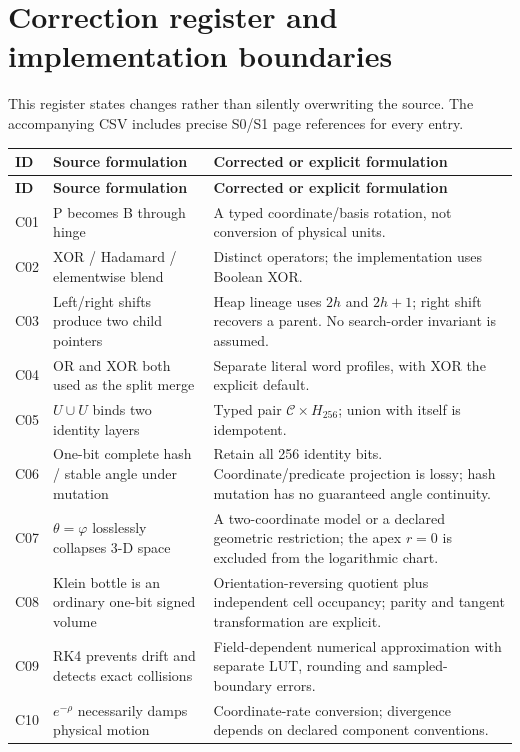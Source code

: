 \documentclass[11pt,a4paper]{article}
\newcommand{\ph}{\varphi}
\begin{document}
\section{Correction register and implementation boundaries}
This register states changes rather than silently overwriting the source. The accompanying CSV includes precise S0/S1 page references for every entry.

\small
\begin{longtable}{@{}P{13mm}P{52mm}P{96mm}@{}}
\toprule\textbf{ID} & \textbf{Source formulation} & \textbf{Corrected or explicit formulation}\\\midrule
\endfirsthead
\toprule\textbf{ID} & \textbf{Source formulation} & \textbf{Corrected or explicit formulation}\\\midrule\endhead
C01 & P becomes B through hinge & A typed coordinate/basis rotation, not conversion of physical units.\\
C02 & XOR / Hadamard / elementwise blend & Distinct operators; the implementation uses Boolean XOR.\\
C03 & Left/right shifts produce two child pointers & Heap lineage uses $2h$ and $2h+1$; right shift recovers a parent. No search-order invariant is assumed.\\
C04 & OR and XOR both used as the split merge & Separate literal word profiles, with XOR the explicit default.\\
C05 & $U\cup U$ binds two identity layers & Typed pair $\mathcal C\times H_{256}$; union with itself is idempotent.\\
C06 & One-bit complete hash / stable angle under mutation & Retain all 256 identity bits. Coordinate/predicate projection is lossy; hash mutation has no guaranteed angle continuity.\\
C07 & $\theta=\ph$ losslessly collapses 3-D space & A two-coordinate model or a declared geometric restriction; the apex $r=0$ is excluded from the logarithmic chart.\\
C08 & Klein bottle is an ordinary one-bit signed volume & Orientation-reversing quotient plus independent cell occupancy; parity and tangent transformation are explicit.\\
C09 & RK4 prevents drift and detects exact collisions & Field-dependent numerical approximation with separate LUT, rounding and sampled-boundary errors.\\
C10 & $e^{-\rho}$ necessarily damps physical motion & Coordinate-rate conversion; divergence depends on declared component conventions.\\

\end{longtable}
\end{document}
